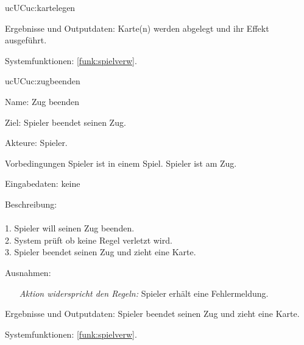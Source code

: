 \begin{description}[leftmargin=5em, style=sameline]
\begin{lhp}{uc}{UC}{uc:kartelegen}
\begin{itemize}
			\end{itemize} 
    	\item [Ergebnisse und Outputdaten:] Karte(n) werden abgelegt und ihr Effekt ausgeführt.
    	\item [Systemfunktionen:] \ref{funk:spielverw}.
    \end{lhp}

    \begin{lhp}{uc}{UC}{uc:zugbeenden}
    	\item [Name:] Zug beenden
    	\item [Ziel:] Spieler beendet seinen Zug.
    	\item [Akteure:] Spieler.
    	\item [Vorbedingungen] Spieler ist in einem Spiel. Spieler ist am Zug.
      	\item [Eingabedaten:] keine
    	\item [Beschreibung:] \hfill\\ \hfill\\
    	1. Spieler will seinen Zug beenden.\\
    	2. System prüft ob keine Regel verletzt wird.\\
    	3. Spieler beendet seinen Zug und zieht eine Karte.\\
    	\item [Ausnahmen:] \hfill
    	\begin{itemize} 
				\item[] \textit{Aktion widerspricht den Regeln:} Spieler erhält eine Fehlermeldung.
				
			\end{itemize} 
    	\item [Ergebnisse und Outputdaten:] Spieler beendet seinen Zug und zieht eine Karte.
    	\item [Systemfunktionen:] \ref{funk:spielverw}.
    \end{lhp}


\end{description}
